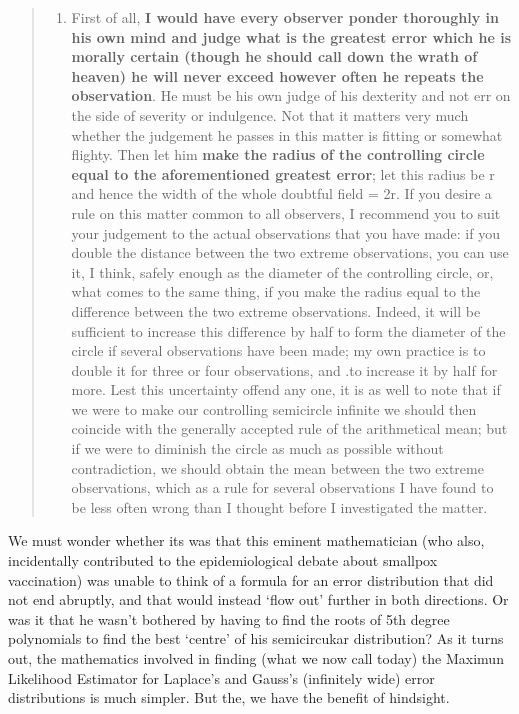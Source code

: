 \documentclass[]{book}
\providecommand{\tightlist}{%
  \setlength{\itemsep}{0pt}\setlength{\parskip}{0pt}}
\begin{document}
\begin{quote}
\begin{enumerate}
\def\labelenumi{\arabic{enumi}.}
\setcounter{enumi}{9}
\tightlist
\item
  First of all, \textbf{I would have every observer ponder thoroughly in his own mind and judge what is the greatest error which he is morally certain (though he should call down the wrath of heaven) he will never exceed however often he repeats the observation}. He must be his own judge of his dexterity and not err on the side of severity or indulgence. Not that it matters very much whether the judgement he passes in this matter is fitting or somewhat flighty. Then let him \textbf{make the radius of the controlling circle equal to the aforementioned greatest error}; let this radius be r and hence the width of the whole doubtful field = 2r.
  If you desire a rule on this matter common to all observers, I recommend you to suit your judgement to the actual observations that you have made: if you double the distance between the two extreme observations, you can use it, I think, safely enough as the diameter of the controlling circle, or, what comes to the same thing, if you make the radius equal to the difference between the two extreme observations. Indeed, it will be sufficient to increase this difference by half to form the diameter of the circle if several observations have been made; my own practice is to double it for three or four observations, and .to increase it by half for more. Lest this uncertainty offend any one, it is as well to note that if we were to make our controlling semicircle infinite we should then coincide with the generally accepted rule of the arithmetical mean; but if we were to diminish the circle as much as possible without contradiction, we should obtain the mean between the two extreme observations, which as a rule for several observations I have found to be less often wrong than I thought
  before I investigated the matter.
\end{enumerate}
\end{quote}

We must wonder whether its was that this eminent mathematician (who also, incidentally contributed to the epidemiological debate about smallpox vaccination) was unable to think of a formula for an error distribution that did not end abruptly, and that would instead `flow out' further in both directions. Or was it that he wasn't bothered by having to find the roots of 5th degree polynomials to find the best `centre' of his semicircukar distribution? As it turns out, the mathematics involved in finding (what we now call today) the Maximun Likelihood Estimator for Laplace's and Gauss's (infinitely wide) error distributions is much simpler. But the, we have the benefit of hindsight.
\end{document}
